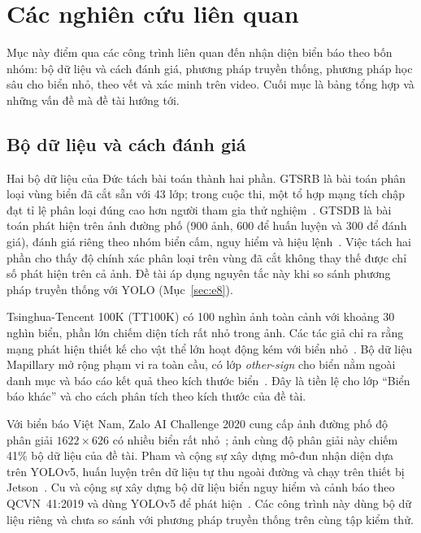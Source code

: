 \section{Các nghiên cứu liên quan}
\label{sec:related_work}

Mục này điểm qua các công trình liên quan đến nhận diện biển báo theo bốn nhóm: bộ dữ liệu và cách đánh giá, phương pháp truyền thống, phương pháp học sâu cho biển nhỏ, theo vết và xác minh trên video. Cuối mục là bảng tổng hợp và những vấn đề mà đề tài hướng tới.

\subsection{Bộ dữ liệu và cách đánh giá}
\label{sec:rw_data}

Hai bộ dữ liệu của Đức tách bài toán thành hai phần. GTSRB là bài toán phân loại vùng biển đã cắt sẵn với 43 lớp; trong cuộc thi, một tổ hợp mạng tích chập đạt tỉ lệ phân loại đúng cao hơn người tham gia thử nghiệm~\cite{stallkamp2012gtsrb}. GTSDB là bài toán phát hiện trên ảnh đường phố (900 ảnh, 600 để huấn luyện và 300 để đánh giá), đánh giá riêng theo nhóm biển cấm, nguy hiểm và hiệu lệnh~\cite{houben2013gtsdb}. Việc tách hai phần cho thấy độ chính xác phân loại trên vùng đã cắt không thay thế được chỉ số phát hiện trên cả ảnh. Đề tài áp dụng nguyên tắc này khi so sánh phương pháp truyền thống với YOLO (Mục~\ref{sec:e8}).

Tsinghua-Tencent 100K (TT100K) có 100 nghìn ảnh toàn cảnh với khoảng 30 nghìn biển, phần lớn chiếm diện tích rất nhỏ trong ảnh. Các tác giả chỉ ra rằng mạng phát hiện thiết kế cho vật thể lớn hoạt động kém với biển nhỏ~\cite{zhu2016tt100k}. Bộ dữ liệu Mapillary mở rộng phạm vi ra toàn cầu, có lớp \textit{other-sign} cho biển nằm ngoài danh mục và báo cáo kết quả theo kích thước biển~\cite{ertler2020mapillary}. Đây là tiền lệ cho lớp ``Biển báo khác'' và cho cách phân tích theo kích thước của đề tài.

Với biển báo Việt Nam, Zalo AI Challenge 2020 cung cấp ảnh đường phố độ phân giải $1622\times626$ có nhiều biển rất nhỏ~\cite{zalo2020tsd}; ảnh cùng độ phân giải này chiếm 41\% bộ dữ liệu của đề tài. Pham và cộng sự xây dựng mô-đun nhận diện dựa trên YOLOv5, huấn luyện trên dữ liệu tự thu ngoài đường và chạy trên thiết bị Jetson~\cite{tung2024vietnam}. Cu và cộng sự xây dựng bộ dữ liệu biển nguy hiểm và cảnh báo theo QCVN~41:2019 và dùng YOLOv5 để phát hiện~\cite{cu2024vietnamese,qcvn41_2019}. Các công trình này dùng bộ dữ liệu riêng và chưa so sánh với phương pháp truyền thống trên cùng tập kiểm thử.

